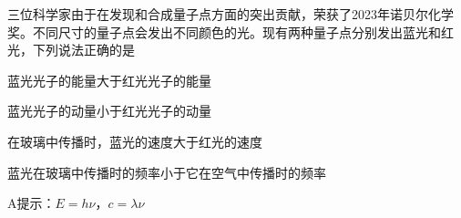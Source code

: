 三位科学家由于在发现和合成量子点方面的突出贡献，荣获了2023年诺贝尔化学奖。不同尺寸的量子点会发出不同颜色的光。现有两种量子点分别发出蓝光和红光，下列说法正确的是\paren[A]
\begin{choices}
	\item 蓝光光子的能量大于红光光子的能量
	\item 蓝光光子的动量小于红光光子的动量
	\item 在玻璃中传播时，蓝光的速度大于红光的速度
	\item 蓝光在玻璃中传播时的频率小于它在空气中传播时的频率
\end{choices}
\begin{answer}
	A\qquad 提示：\(E = h\nu\)，\(c =\lambda\nu\)
\end{answer}